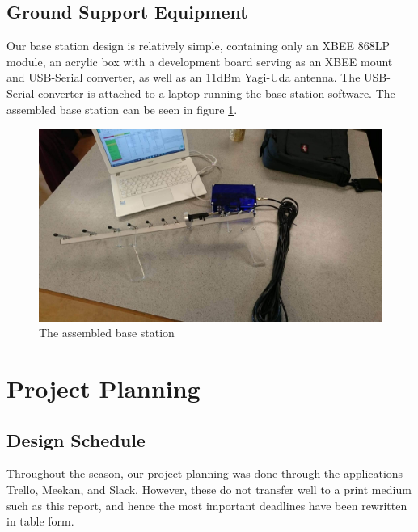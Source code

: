 \documentclass[]{report}
\begin{document}
\section{Ground Support Equipment}
Our base station design is relatively simple, containing only an XBEE 868LP module, an acrylic box with a development board serving as an XBEE mount and USB-Serial converter, as well as an 11dBm Yagi-Uda antenna. The USB-Serial converter is attached to a laptop running the base station software. The assembled base station can be seen in figure \ref{bsradio}.

\begin{figure}[h]
	\hfill\includegraphics[scale=0.2]{bsradio.jpeg}\hspace*{\fill}
	\caption{The assembled base station}
	\label{bsradio}
\end{figure}

\chapter{Project Planning}
\section{Design Schedule}
Throughout the season, our project planning was done through the applications Trello, Meekan, and Slack. However, these do not transfer well to a print medium such as this report, and hence the most important deadlines have been rewritten in table form.
\end{document}
